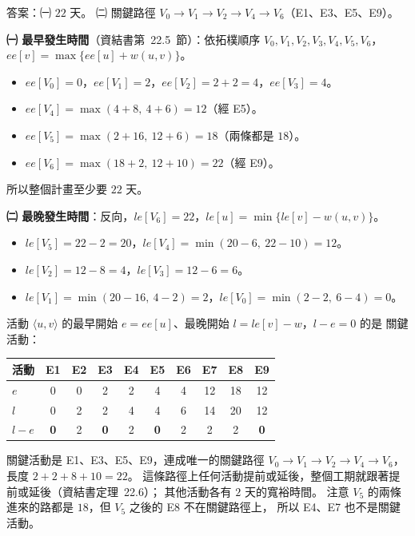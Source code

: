 \begin{pastsoln}
答案：㈠ $22$ 天。 ㈡ 關鍵路徑 $V_0 \to V_1 \to V_2 \to V_4 \to V_6$（E1、E3、E5、E9）。

\textbf{㈠ 最早發生時間}（資結書第~22.5~節）：依拓樸順序 $V_0, V_1, V_2, V_3, V_4, V_5, V_6$，
$\mathit{ee}[v] = \max\{\mathit{ee}[u] + w(u,v)\}$。
\begin{itemize}
\item $\mathit{ee}[V_0] = 0$，$\mathit{ee}[V_1] = 2$，$\mathit{ee}[V_2] = 2 + 2 = 4$，$\mathit{ee}[V_3] = 4$。
\item $\mathit{ee}[V_4] = \max(4 + 8,\ 4 + 6) = 12$（經 E5）。
\item $\mathit{ee}[V_5] = \max(2 + 16,\ 12 + 6) = 18$（兩條都是 $18$）。
\item $\mathit{ee}[V_6] = \max(18 + 2,\ 12 + 10) = 22$（經 E9）。
\end{itemize}
所以整個計畫至少要 $22$ 天。

\textbf{㈡ 最晚發生時間}：反向，$\mathit{le}[V_6] = 22$，$\mathit{le}[u] = \min\{\mathit{le}[v] - w(u,v)\}$。
\begin{itemize}
\item $\mathit{le}[V_5] = 22 - 2 = 20$，$\mathit{le}[V_4] = \min(20 - 6,\ 22 - 10) = 12$。
\item $\mathit{le}[V_2] = 12 - 8 = 4$，$\mathit{le}[V_3] = 12 - 6 = 6$。
\item $\mathit{le}[V_1] = \min(20 - 16,\ 4 - 2) = 2$，$\mathit{le}[V_0] = \min(2 - 2,\ 6 - 4) = 0$。
\end{itemize}
活動 $\langle u, v\rangle$ 的最早開始 $e = \mathit{ee}[u]$、最晚開始 $l = \mathit{le}[v] - w$，$l - e = 0$ 的是
關鍵活動：
\begin{center}
\begin{tabular}{lccccccccc}
\toprule
活動 & E1 & E2 & E3 & E4 & E5 & E6 & E7 & E8 & E9 \\
\midrule
$e$ & 0 & 0 & 2 & 2 & 4 & 4 & 12 & 18 & 12 \\
$l$ & 0 & 2 & 2 & 4 & 4 & 6 & 14 & 20 & 12 \\
$l - e$ & \textbf{0} & 2 & \textbf{0} & 2 & \textbf{0} & 2 & 2 & 2 & \textbf{0} \\
\bottomrule
\end{tabular}
\end{center}
關鍵活動是 E1、E3、E5、E9，連成唯一的關鍵路徑 $V_0 \to V_1 \to V_2 \to V_4 \to V_6$，長度
$2 + 2 + 8 + 10 = 22$。 這條路徑上任何活動提前或延後，整個工期就跟著提前或延後（資結書定理~22.6）；
其他活動各有 $2$ 天的寬裕時間。 注意 $V_5$ 的兩條進來的路都是 $18$，但 $V_5$ 之後的 E8 不在關鍵路徑上，
所以 E4、E7 也不是關鍵活動。
\end{pastsoln}
